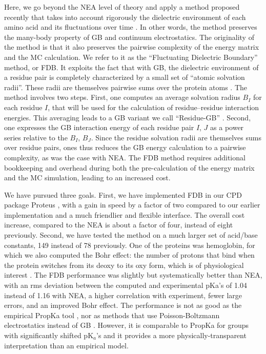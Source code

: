 \documentclass[a4paper,12pt]{article}
\newcommand{\pk}{pK$_a$}
\begin{document}
Here, we go beyond the NEA level of theory and apply a method proposed recently that takes into account rigorously the
dielectric environment of each amino acid and its fluctuations over time \cite{Archontis05b,Aleksandrov10b}. In other
words, the method preserves the many-body property of GB and continuum electrostatics. The originality of the method
is that it also preserves the pairwise complexity of the energy matrix and the MC calculation. We refer to it as the
``Fluctuating Dielectric Boundary'' method, or FDB. It exploits the fact that with GB, the dielectric environment of
a residue pair is completely characterized by a small set of ``atomic solvation radii''. These radii are themselves
pairwise sums over the protein atoms \cite{Hawkins95, Schaefer96}. The method involves two steps. First, one computes
an average solvation radius $B_I$ for each residue $I$, that will be used for the calculation of residue--residue
interaction energies. This averaging leads to a GB variant we call ``Residue-GB'' \cite{Archontis05b}. Second, one
expresses the GB interaction energy of each residue pair $I$, $J$ as a power series relative to the $B_I$, $B_J$.
Since the residue solvation radii are themselves sums over residue pairs, ones thus reduces the GB energy calculation
to a pairwise complexity, as was the case with NEA. The FDB method requires additional bookkeeping and overhead during
both the pre-calculation of the energy matrix and the MC simulation, leading to an increased cost.

We have pursued three goals. First, we have implemented FDB in our CPD package Proteus \cite{Schmidt08,Simonson13b,
Polydorides16}, with a gain in speed by a factor of two compared to our earlier implementation \cite{Aleksandrov10b}
and a much friendlier and flexible interface. The overall cost increase, compared to the NEA is about a factor of four,
instead of eight previously. Second, we have tested the method on a much larger set of acid/base constants, 149 instead
of 78 previously. One of the proteins was hemoglobin, for which we also computed the Bohr effect: the number of protons
that bind when the protein switches from its deoxy to its oxy form, which is of physiological interest \cite{PerutzBK,
Zheng13}. The FDB performance was slightly but systematically better than NEA, with an rms deviation between the
computed and experimental pKa’s of 1.04 instead of 1.16 with NEA, a higher correlation with experiment, fewer large
errors, and an improved Bohr effect. The performance is not as good as the empirical PropKa tool \cite{Olsson11}, nor
as methods that use Poisson-Boltzmann electrostatics instead of GB \cite{Georgescu02,Wang15}. However, it is comparable
to PropKa for groups with significantly shifted \pk’s and it provides a more physically-transparent interpretation than
an empirical model.
\end{document}
